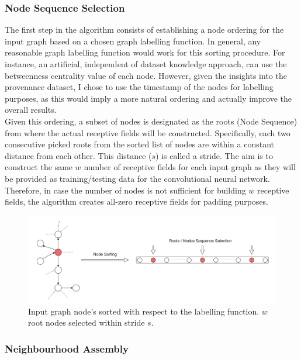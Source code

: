 \subsubsection*{Node Sequence Selection} \label{node_seq_sel}

The first step in the algorithm consists of establishing a node ordering for the input graph based on a chosen graph labelling function. In general, any reasonable graph labelling function would work for this sorting procedure. For instance, an artificial, independent of dataset knowledge approach, can use the betweenness centrality value of each node. However, given the insights into the provenance dataset, I chose to use the timestamp of the nodes for labelling purposes, as this would imply a more natural ordering and actually improve the overall results. \\

Given this ordering, a subset of nodes is designated as the roots (Node Sequence) from where the actual receptive fields will be constructed. Specifically, each two consecutive picked roots from the sorted list of nodes are within a constant distance from each other. This distance ($s$) is called a stride. The aim is to construct the same $w$ number of receptive fields for each input graph as they will be provided as training/testing data for the convolutional neural network. Therefore, in case the number of nodes is not sufficient for building $w$ receptive fields, the algorithm creates all-zero receptive fields for padding purposes. \\

\begin{figure}[H]
  \centering
  \includegraphics[scale=0.5]{Images/nodeseqsel.png}
  \caption{Input graph node's sorted with respect to the labelling function. $w$ root nodes selected within stride $s$.}
  \label{nodeseqsel}
\end{figure}

\subsubsection*{Neighbourhood Assembly}

